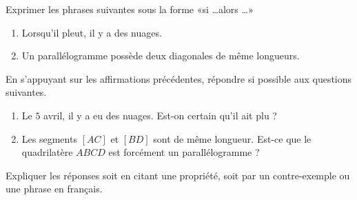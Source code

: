 
\begin{exercice}\label{exosmath-0897}

    Exprimer les phrases suivantes sous la forme «si \ldots alors \ldots» 
    \begin{enumerate}
        \item
            Lorsqu'il pleut, il y a des nuages.
        \item
            Un parallélogramme possède deux diagonales de même longueurs.
    \end{enumerate}
    En s'appuyant sur les affirmations précédentes, répondre si possible aux questions suivantes.
    \begin{enumerate}
        \item 
            Le \( 5\) avril, il y a eu des nuages. Est-on certain qu'il ait plu ?
        \item
            Les segments \( [AC]\) et \( [BD]\) sont de même longueur. Est-ce que le quadrilatère \( ABCD\) est forcément un parallélogramme ?
    \end{enumerate}

    Expliquer les réponses soit en citant une propriété, soit par un contre-exemple ou une phrase en français.

\end{exercice}
